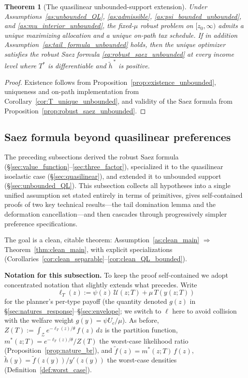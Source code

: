 \documentclass[12pt,a4paper]{article}
\theoremstyle{definition}
\theoremstyle{plain}
\newtheorem{theorem}{Theorem}[section]
\theoremstyle{remark}
\newcommand{\zlow}{z_{\scriptscriptstyle 0}}
\newcommand{\calU}{\mathcal{U}}
\newcommand{\calZ}{\mathcal{Z}}
\begin{document}
\begin{theorem}[The quasilinear unbounded-support extension]
\label{thm:unbounded_QL_extension}
Under Assumptions~\ref{as:unbounded_QL},
\ref{as:admissible},
\ref{as:psi_bounded_unbounded}, and
\ref{as:mu_interior_unbounded}, the fixed-$\mu$ robust problem on
$[\zlow,\infty)$ admits a unique maximizing allocation and a unique
on-path tax schedule.  If in addition
Assumption~\ref{as:tail_formula_unbounded} holds, then the unique
optimizer satisfies the robust Saez formula
\eqref{eq:robust_saez_unbounded} at every income level where $T^*$ is
differentiable and $\widetilde h^{\,*}$ is positive.
\end{theorem}

\begin{proof}
Existence follows from Proposition~\ref{prop:existence_unbounded},
uniqueness and on-path implementation from
Corollary~\ref{cor:T_unique_unbounded}, and validity of the Saez
formula from Proposition~\ref{prop:robust_saez_unbounded}.
\end{proof}

\subsection{Saez formula beyond quasilinear  preferences}
\label{sec:clean_proof}

The preceding subsections derived the robust Saez formula
(\S\ref{sec:value_function}--\ref{sec:three_factor}),
specialized it to the quasilinear isoelastic case
(\S\ref{sec:quasilinear}), and extended it to unbounded
support (\S\ref{sec:unbounded_QL}).
This subsection collects all hypotheses into a single
unified assumption set stated entirely in terms of
primitives, gives self-contained proofs of two key
technical results---the tail domination lemma and the
deformation cancellation---and then cascades through
progressively simpler preference specifications.

The goal is a clean, citable theorem:
Assumption~\ref{as:clean_main} $\Rightarrow$
Theorem~\ref{thm:clean_main}, with explicit
specializations (Corollaries~\ref{cor:clean_separable}--\ref{cor:clean_QL_bounded}).

\medskip\noindent\textbf{Notation for this subsection.}
To keep the proof self-contained we adopt concentrated
notation that slightly extends what precedes.  Write
\begin{equation}
\label{eq:clean_ell}
  \ell_T(z) := \psi(z)\,\calU(z; T) + \mu\,T(y(z; T))
\end{equation}
for the planner's per-type payoff (the quantity denoted
$g(z)$ in \S\ref{sec:natures_response}--\S\ref{sec:envelope};
we switch to $\ell$ here to avoid collision with the
welfare weight $g(y) = \psi U_c/\mu$).  As before,
$Z(T) := \int_\calZ e^{-\ell_T(z)/\theta}\,f(z)\,dz$ is the
partition function, $m^*(z;T) = e^{-\ell_T(z)/\theta}/Z(T)$
the worst-case likelihood ratio
(Proposition~\ref{prop:nature_br}), and
$\widetilde{f}(z) = m^*(z;T)\,f(z)$,
$\widetilde{h}(y) = \widetilde{f}(z(y))/y'(z(y))$
the worst-case densities
(Definition~\ref{def:worst_case}).
\end{document}
